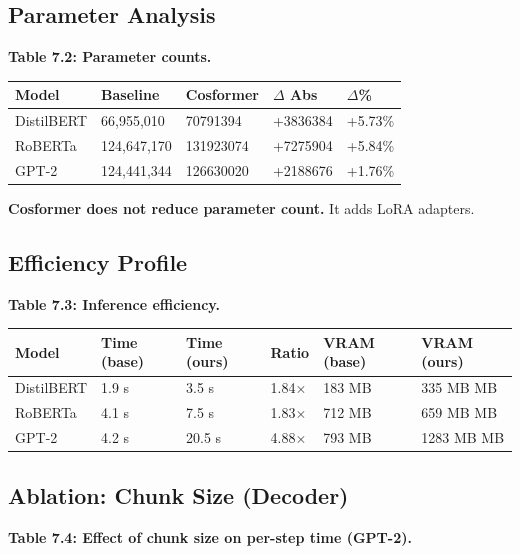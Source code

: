 \subsection{Parameter Analysis}

\textbf{Table 7.2: Parameter counts.}

\begin{table}[H]
\centering
\small
\begin{tabular}{lllll}
\toprule
\textbf{Model} & \textbf{Baseline} & \textbf{Cosformer} & \textbf{$\Delta$ Abs} & \textbf{$\Delta$\%} \\
\midrule
DistilBERT & 66,955,010 & 70791394 & +3836384 & +5.73\% \\
RoBERTa & 124,647,170 & 131923074 & +7275904 & +5.84\% \\
GPT-2 & 124,441,344 & 126630020 & +2188676 & +1.76\% \\
\bottomrule
\end{tabular}
\end{table}

\textbf{Cosformer does not reduce parameter count.} It adds LoRA adapters.

\subsection{Efficiency Profile}

\textbf{Table 7.3: Inference efficiency.}

\begin{table}[H]
\centering
\small
\begin{tabular}{llllll}
\toprule
\textbf{Model} & \textbf{Time (base)} & \textbf{Time (ours)} & \textbf{Ratio} & \textbf{VRAM (base)} & \textbf{VRAM (ours)} \\
\midrule
DistilBERT & 1.9 s & 3.5 s & 1.84$\times$ & 183 MB & 335 MB MB \\
RoBERTa & 4.1 s & 7.5 s & 1.83$\times$ & 712 MB & 659 MB MB \\
GPT-2 & 4.2 s & 20.5 s & 4.88$\times$ & 793 MB & 1283 MB MB \\
\bottomrule
\end{tabular}
\end{table}

\subsection{Ablation: Chunk Size (Decoder)}

\textbf{Table 7.4: Effect of chunk size on per-step time (GPT-2).}

